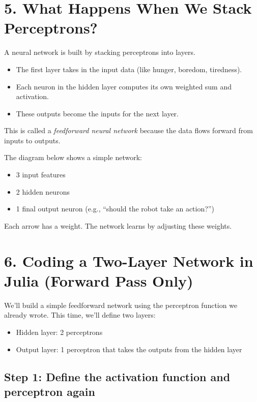 \documentclass{book}
\begin{document}
\section*{5. What Happens When We Stack Perceptrons?}

A neural network is built by stacking perceptrons into layers.

\begin{itemize}
  \item The first layer takes in the input data (like hunger, boredom, tiredness).
  \item Each neuron in the hidden layer computes its own weighted sum and activation.
  \item These outputs become the inputs for the next layer.
\end{itemize}

This is called a \textit{feedforward neural network} because the data flows forward from inputs to outputs.

\vspace{1em}

The diagram below shows a simple network:
\begin{itemize}
  \item 3 input features
  \item 2 hidden neurons
  \item 1 final output neuron (e.g., “should the robot take an action?”)
\end{itemize}

Each arrow has a weight. The network learns by adjusting these weights.


\section*{6. Coding a Two-Layer Network in Julia (Forward Pass Only)}

We’ll build a simple feedforward network using the perceptron function we already wrote. This time, we’ll define two layers:

\begin{itemize}
  \item Hidden layer: 2 perceptrons
  \item Output layer: 1 perceptron that takes the outputs from the hidden layer
\end{itemize}

\subsection*{Step 1: Define the activation function and perceptron again}
\end{document}
